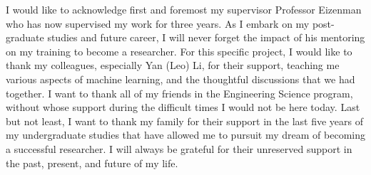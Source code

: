 \documentclass[onehalfspaced, 12pt, normalmargins]{ut-thesis}
\begin{document}
\begin{preliminary}
%



\begin{acknowledgements}
I would like to acknowledge first and foremost my supervisor Professor Eizenman who has now supervised my work for three years. As I embark on my post-graduate studies and future career, I will never forget the impact of his mentoring on my training to become a researcher. For this specific project, I would like to thank my colleagues, especially Yan (Leo) Li, for their support, teaching me various aspects of machine learning, and the thoughtful discussions that we had together. I want to thank all of my friends in the Engineering Science program, without whose support during the difficult times I would not be here today. Last but not least, I want to thank my family for their support in the last five years of my undergraduate studies that have allowed me to pursuit my dream of becoming a successful researcher. I will always be grateful for their unreserved support in the past, present, and future of my life. 
\end{acknowledgements}

\tableofcontents

\listoftables


\end{preliminary}
\end{document}
